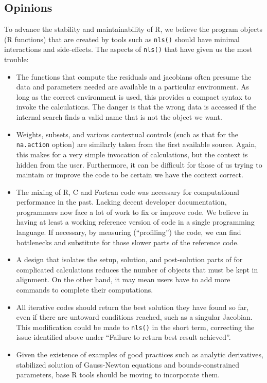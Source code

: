 \documentclass[
]{article}
\begin{document}
\hypertarget{opinions}{%
\subsection{Opinions}\label{opinions}}

To advance the stability and maintainability of R, we believe the
program objects (R functions) that are created by tools such as
\texttt{nls()} should have minimal interactions and side-effects. The
aspects of \texttt{nls()} that have given us the most trouble:

\begin{itemize}
\item
  The functions that compute the residuals and jacobians often presume
  the data and parameters needed are available in a particular
  environment. As long as the correct environment is used, this provides
  a compact syntax to invoke the calculations. The danger is that the
  wrong data is accessed if the internal search finds a valid name that
  is not the object we want.
\item
  Weights, subsets, and various contextual controls (such as that for
  the \texttt{na.action} option) are similarly taken from the first
  available source. Again, this makes for a very simple invocation of
  calculations, but the context is hidden from the user. Furthermore, it
  can be difficult for those of us trying to maintain or improve the
  code to be certain we have the context correct.
\item
  The mixing of R, C and Fortran code was necessary for computational
  performance in the past. Lacking decent developer documentation,
  programmers now face a lot of work to fix or improve code. We believe
  in having at least a working reference version of code in a single
  programming language. If necessary, by measuring (``profiling'') the
  code, we can find bottlenecks and substitute for those slower parts of
  the reference code.
\item
  A design that isolates the setup, solution, and post-solution parts of
  for complicated calculations reduces the number of objects that must
  be kept in alignment. On the other hand, it may mean users have to add
  more commands to complete their computations.
\item
  All iterative codes should return the best solution they have found so
  far, even if there are untoward conditions reached, such as a singular
  Jacobian. This modification could be made to \texttt{nls()} in the
  short term, correcting the issue identified above under ``Failure to
  return best result achieved''.
\item
  Given the existence of examples of good practices such as analytic
  derivatives, stabilized solution of Gauss-Newton equations and
  bounds-constrained parameters, base R tools should be moving to
  incorporate them.
\end{itemize}
\end{document}
